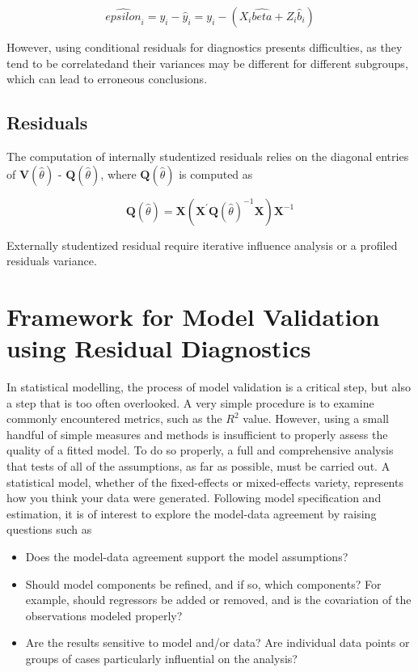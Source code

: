 \documentclass[Main.tex]{subfiles}
\begin{document}
\[ \hat{epsilon}_{i} = y_{i} - \hat{y}_{i} = y_{i} - ( X_{i}\hat{beta} + Z_{i}\hat{b}_{i}) \]

However, using conditional residuals for diagnostics presents difficulties, as they tend to be correlatedand their variances may be different for different subgroups, which can lead to erroneous conclusions.



\subsection{Residuals}

The computation of internally studentized residuals relies on the diagonal entries of
$\boldsymbol{V} (\hat{\theta})$ - $\boldsymbol{Q} (\hat{\theta})$, where $\boldsymbol{Q} (\hat{\theta})$ is computed as

\[ \boldsymbol{Q} (\hat{\theta}) = \boldsymbol{X} ( \boldsymbol{X}^{\prime}\boldsymbol{Q} (\hat{\theta})^{-1}\boldsymbol{X})\boldsymbol{X}^{-1} \]

Externally  studentized residual require iterative influence analysis or a profiled residuals variance.




\section{Framework for Model Validation using Residual Diagnostics}
In statistical modelling, the process of model validation is a critical step, but also a step that is too often overlooked. A very simple procedure is to examine commonly encountered
metrics, such as the $R^2$ value. However, using a small handful of simple measures and methods is insufficient to properly assess the quality of a fitted model. To do so properly, a full and comprehensive
analysis that tests of all of the assumptions, as far as possible, must be carried out. A statistical model, whether of the fixed-effects or mixed-effects variety, represents how you think your data
were generated. Following model specification and estimation, it is of interest to explore the model-data
agreement by raising questions such as
\begin{itemize}
	\item Does the model-data agreement support the model assumptions?
	\item Should model components be refined, and if so, which components? For example, should regressors
	be added or removed, and is the covariation of the observations modeled properly?
	\item Are the results sensitive to model and/or data? Are individual data points or groups of cases particularly
	influential on the analysis?
\end{itemize}
\end{document}

